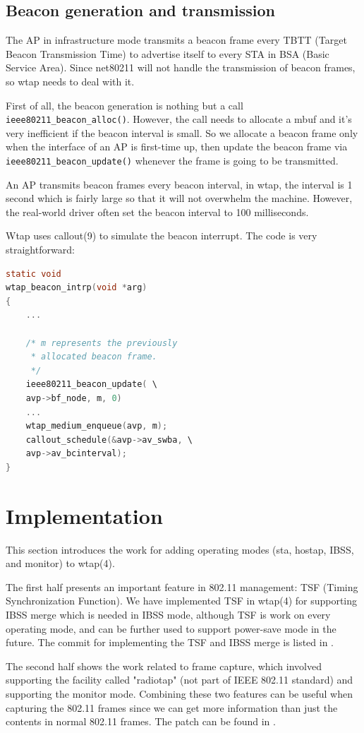 \documentclass[conference]{IEEEtran}
\begin{document}
\subsection{Beacon generation and transmission}
The AP in infrastructure mode transmits a beacon frame every TBTT (Target Beacon Transmission Time) to advertise itself to every STA in BSA (Basic Service Area). Since net80211 will not handle the transmission of beacon frames, so wtap needs to deal with it.

First of all, the beacon generation is nothing but a call \lstinline{ieee80211_beacon_alloc()}. However, the call needs to allocate a mbuf and it’s very inefficient if the beacon interval is small. So we allocate a beacon frame only when the interface of an AP is first-time up, then update the beacon frame via \lstinline{ieee80211_beacon_update()} whenever the frame is going to be transmitted.

An AP transmits beacon frames every beacon interval, in wtap, the interval is 1 second which is fairly large so that it will not overwhelm the machine. However, the real-world driver often set the beacon interval to 100 milliseconds.

Wtap uses callout(9) to simulate the beacon interrupt. The code is very straightforward:
\begin{lstlisting}[language=C]
static void
wtap_beacon_intrp(void *arg)
{
    ...
    
    /* m represents the previously 
     * allocated beacon frame.
     */
    ieee80211_beacon_update( \
    avp->bf_node, m, 0)
    ...
    wtap_medium_enqueue(avp, m);
    callout_schedule(&avp->av_swba, \
    avp->av_bcinterval);
}
\end{lstlisting}

\section{Implementation}
This section introduces the work for adding operating modes (sta, hostap, IBSS, and monitor) to wtap(4).

The first half presents an important feature in 802.11 management: TSF (Timing Synchronization Function). We have implemented TSF in wtap(4) for supporting IBSS merge which is needed in IBSS mode, although TSF is work on every operating mode, and can be further used to support power-save mode in the future. The commit for implementing the TSF and IBSS merge is listed in \cite{commit:adhoc}.

The second half shows the work related to frame capture, which involved supporting the facility called "radiotap" (not part of IEEE 802.11 standard) and supporting the monitor mode. Combining these two features can be useful when capturing the 802.11 frames since we can get more information than just the contents in normal 802.11 frames. The patch can be found in \cite{commit:monitor}.
\end{document}
